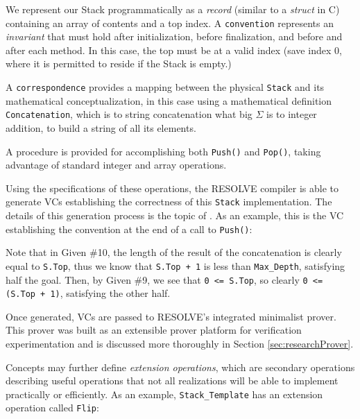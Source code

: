 

We represent our Stack programmatically as a \emph{record} (similar to a \emph{struct} in C) containing an array of contents and a top index.  A \texttt{convention} represents an \emph{invariant} that must hold after initialization, before finalization, and before and after each method.  In this case, the top must be at a valid index (save index 0, where it is permitted to reside if the Stack is empty.)

A \texttt{correspondence} provides a mapping between the physical \texttt{Stack} and its mathematical conceptualization, in this case using a mathematical definition \texttt{Concatenation}, which is to string concatenation what big $\Sigma$ is to integer addition, to build a string of all its elements.

A procedure is provided for accomplishing both \texttt{Push()} and \texttt{Pop()}, taking advantage of standard integer and array operations.

Using the specifications of these operations, the RESOLVE compiler is able to generate VCs establishing the correctness of this \texttt{Stack} implementation.  The details of this generation process is the topic of \cite{hartonDissertation}.  As an example, this is the VC establishing the convention at the end of a call to \texttt{Push()}:



Note that in Given \#10, the length of the result of the concatenation is clearly equal to \texttt{S.Top}, thus we know that \texttt{S.Top + 1} is less than \texttt{Max\_Depth}, satisfying half the goal.  Then, by Given \#9, we see that \texttt{0 <= S.Top}, so clearly \texttt{0 <= (S.Top + 1)}, satisfying the other half.

Once generated, VCs are passed to RESOLVE's integrated minimalist prover.  This prover was built as an extensible prover platform for verification experimentation\cite{smith10} and is discussed more thoroughly in Section \ref{sec:researchProver}.

Concepts may further define \emph{extension operations}, which are secondary operations describing useful operations that not all realizations will be able to implement practically or efficiently.  As an example, \texttt{Stack\_Template} has an extension operation called \texttt{Flip}:

\mbox{}


